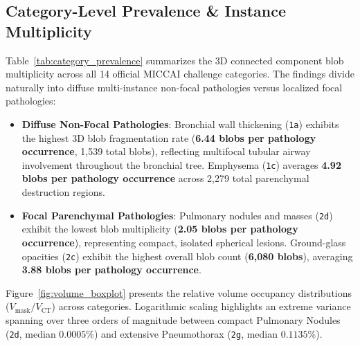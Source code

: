 \documentclass[11pt,a4paper]{article}
\begin{document}
\subsection{Category-Level Prevalence \& Instance Multiplicity}
Table~\ref{tab:category_prevalence} summarizes the 3D connected component blob multiplicity across all 14 official MICCAI challenge categories. The findings divide naturally into diffuse multi-instance non-focal pathologies versus localized focal pathologies:
\begin{itemize}
    \item \textbf{Diffuse Non-Focal Pathologies}: Bronchial wall thickening (\texttt{1a}) exhibits the highest 3D blob fragmentation rate (\textbf{6.44 blobs per pathology occurrence}, 1,539 total blobs), reflecting multifocal tubular airway involvement throughout the bronchial tree. Emphysema (\texttt{1c}) averages \textbf{4.92 blobs per pathology occurrence} across 2,279 total parenchymal destruction regions.
    \item \textbf{Focal Parenchymal Pathologies}: Pulmonary nodules and masses (\texttt{2d}) exhibit the lowest blob multiplicity (\textbf{2.05 blobs per pathology occurrence}), representing compact, isolated spherical lesions. Ground-glass opacities (\texttt{2c}) exhibit the highest overall blob count (\textbf{6,080 blobs}), averaging \textbf{3.88 blobs per pathology occurrence}.
\end{itemize}

Figure~\ref{fig:volume_boxplot} presents the relative volume occupancy distributions ($V_{\text{mask}} / V_{\text{CT}}$) across categories. Logarithmic scaling highlights an extreme variance spanning over three orders of magnitude between compact Pulmonary Nodules (\texttt{2d}, median $0.0005\%$) and extensive Pneumothorax (\texttt{2g}, median $0.1135\%$).
\end{document}
